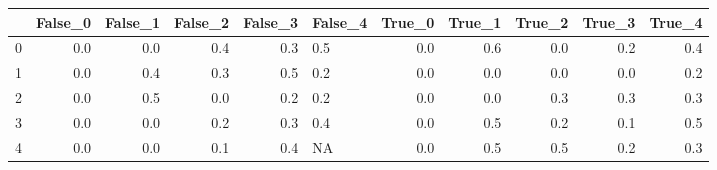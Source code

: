 \begin{tabular}{lrrrrlrrrrr}
\toprule
{} &  False\_0 &  False\_1 &  False\_2 &  False\_3 & False\_4 &  True\_0 &  True\_1 &  True\_2 &  True\_3 &  True\_4 \\ \hline
\midrule
0 &      0.0 &      0.0 &      0.4 &      0.3 &     0.5 &     0.0 &     0.6 &     0.0 &     0.2 &     0.4 \\ \hline
1 &      0.0 &      0.4 &      0.3 &      0.5 &     0.2 &     0.0 &     0.0 &     0.0 &     0.0 &     0.2 \\ \hline
2 &      0.0 &      0.5 &      0.0 &      0.2 &     0.2 &     0.0 &     0.0 &     0.3 &     0.3 &     0.3 \\ \hline
3 &      0.0 &      0.0 &      0.2 &      0.3 &     0.4 &     0.0 &     0.5 &     0.2 &     0.1 &     0.5 \\ \hline
4 &      0.0 &      0.0 &      0.1 &      0.4 &      NA &     0.0 &     0.5 &     0.5 &     0.2 &     0.3 \\ \hline
\bottomrule
\end{tabular}
